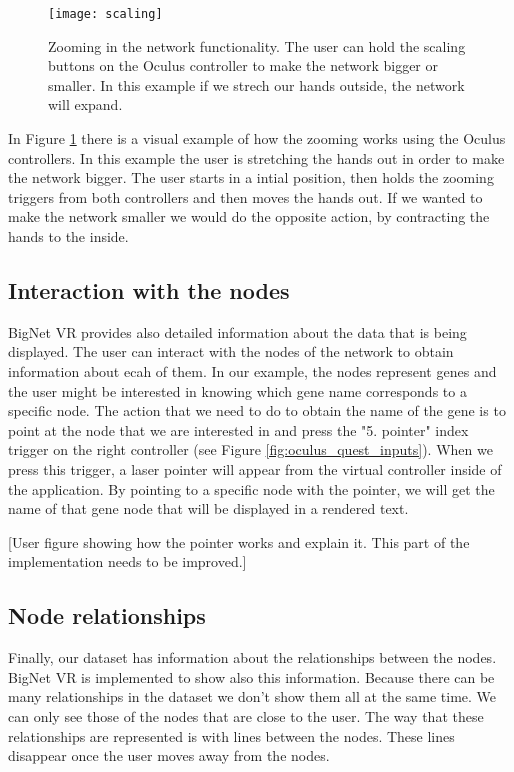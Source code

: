 \begin{figure}[h!]
    \centering%
    \texttt{[image: scaling]}
    \caption{Zooming in the network functionality. The user can hold the scaling buttons on the Oculus controller to make the network bigger or smaller. In this example if we strech our hands outside, the network will expand.}
    \label{fig:scaling}
\end{figure}%


In Figure \ref{fig:scaling} there is a visual example of how the zooming works using the Oculus controllers. In this example the user is stretching the hands out in order to make the network bigger. The user starts in a intial position, then holds the zooming triggers from both controllers and then moves the hands out. If we wanted to make the network smaller we would do the opposite action, by contracting the hands to the inside.

\subsection{Interaction with the nodes}
BigNet VR provides also detailed information about the data that is being displayed. The user can interact with the nodes of the network to obtain information about ecah of them. In our example, the nodes represent genes and the user might be interested in knowing which gene name corresponds to a specific node. The action that we need to do to obtain the name of the gene is to point at the node that we are interested in and press the "5. pointer" index trigger on the right controller (see Figure \ref{fig:oculus_quest_inputs}). When we press this trigger, a laser pointer will appear from the virtual controller inside of the application. By pointing to a specific node with the pointer, we will get the name of that gene node that will be displayed in a rendered text.

[User figure showing how the pointer works and explain it. This part of the implementation needs to be improved.]

\subsection{Node relationships}
Finally, our dataset has information about the relationships between the nodes. BigNet VR is implemented to show also this information. Because there can be many relationships in the dataset we don't show them all at the same time. We can only see those of the nodes that are close to the user. The way that these relationships are represented is with lines between the nodes. These lines disappear once the user moves away from the nodes.

